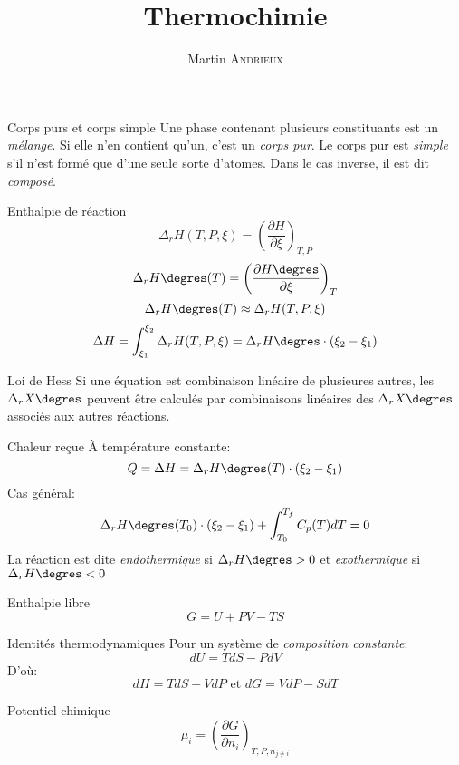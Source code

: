 \documentclass[french, a4paper, 11pt, twocolumn]{article}
\title{Thermochimie}
\author{Martin \textsc{Andrieux}}
\date{}
\newcommand{\po}{\left(}         %
\newcommand{\pf}{\right)}        %
\newcommand{\pof}[1]{\po #1 \pf} %
\newcommand{\drz}[1]{\Delta_r#1\degres}
\begin{document}
\maketitle

\begin{cadre}{Corps purs et corps simple}
  Une phase contenant plusieurs constituants est un \emph{mélange}. Si elle n'en contient qu'un, c'est un \emph{corps pur}.
  Le corps pur est \emph{simple} s'il n'est formé que d'une seule sorte d'atomes. Dans le cas inverse, il est dit \emph{composé}.
\end{cadre}

\begin{cadre}{Enthalpie de réaction}
  \[\Delta_{r}H(T, P, \xi) = \pof{\dfrac{\partial H}{\partial \xi}}_{T,P}\]
  \[\drz{H}(T) = \pof{\dfrac{\partial H\degres}{\partial \xi}}_{T}\]
  \[\drz{H}(T) \approx \Delta_{r}H(T,P,\xi)\]
  \[\Delta H = \int_{\xi_{1}}^{\xi_{2}}\Delta_{r}H(T,P,\xi)=\drz{H}\cdot\pof{\xi_{2}-\xi_{1}} \]
\end{cadre}

\begin{cadre}{Loi de Hess}
  Si une équation est combinaison linéaire de plusieures autres, les $\drz{X}$ peuvent être calculés par combinaisons linéaires des $\drz{X}$ associés aux autres réactions.
\end{cadre}

\begin{cadre}{Chaleur reçue}
  À température constante:
  \[Q = \Delta H = \drz{H}(T)\cdot\pof{\xi_{2}-\xi_{1}}\]
  Cas général:
  \[\drz{H}(T_{0})\cdot\pof{\xi_{2}-\xi_{1}}+\int_{T_{0}}^{T_{f}}C_{p}(T)dT = 0 \]
  La réaction est dite \emph{endothermique} si $\drz{H} > 0$ et \emph{exothermique} si $\drz{H} < 0$
\end{cadre}

\begin{cadre}{Enthalpie libre}
  \[G = U + PV - TS\]
\end{cadre}

\begin{cadre}{Identités thermodynamiques}
  Pour un système de \emph{composition constante}:
  \[dU = TdS - PdV\]
  D'où:
  \[dH = TdS + VdP\text{ et }dG = VdP - SdT\]
\end{cadre}

\begin{cadre}{Potentiel chimique}
  \[\mu_{i} = \pof{\dfrac{\partial G}{\partial n_{i}}}_{T,P,n_{j\neq i}}\]
\end{cadre}
\end{document}
